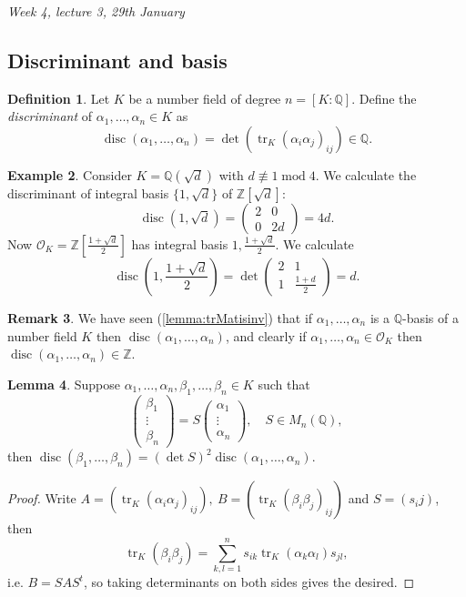\documentclass{article}
\newcommand{\Z}{\mathbb{Z}}
\newcommand{\Q}{\mathbb{Q}}
\newcommand{\tr}{\operatorname{tr}}
\newcommand{\Mod}{\operatorname{mod}}
\newcommand{\disc}{\operatorname{disc}}
\newcommand{\ri}{\mathcal{O}}
\theoremstyle{definition}
\newtheorem{defn}{Definition}[subsection]
\newtheorem{lemma}[defn]{Lemma}
\newtheorem{example}[defn]{Example}
\newtheorem{remark}[defn]{Remark}
\begin{document}
\begin{flushright}
\textit{Week 4, lecture 3, 29th January}
\end{flushright}

\subsection{Discriminant and basis}

\begin{defn}
Let $K$ be a number field of degree $n=[K:\Q]$. Define the \textit{discriminant} of $\alpha_1,\ldots,\alpha_n\in K$ as
\[
\disc(\alpha_1,\ldots,\alpha_n)=\det (\tr_K(\alpha_i\alpha_j)_{ij})\in\Q.
\]
\end{defn}

\begin{example}
Consider $K=\Q\left(\sqrt d\right)$ with $d\nequiv 1\Mod 4$. We calculate the discriminant of integral basis $\{1,\sqrt d\}$ of $\Z\left[\sqrt d\right]$:
\[
\disc\left(1,\sqrt d\right)=\begin{pmatrix}
2 & 0 \\ 0 & 2d
\end{pmatrix}=4d.
\]
Now $\ri_K=\Z\left[\frac{1+\sqrt d}{2}\right]$ has integral basis $1,\frac{1+\sqrt d}{2}$. We calculate
\[
\disc\left(1,\frac{1+\sqrt d}{2}\right)=\det\begin{pmatrix}
2 & 1 \\ 1 & \frac{1+d}{2}
\end{pmatrix}=d.
\]
\end{example}

\begin{remark}
We have seen (\ref{lemma:trMatisinv}) that if $\alpha_1,\ldots,\alpha_n$ is a $\Q$-basis of a number field $K$ then $\disc(\alpha_1,\ldots,\alpha_n)$, and clearly if $\alpha_1,\ldots,\alpha_n\in\ri_K$ then $\disc(\alpha_1,\ldots,\alpha_n)\in\Z$.
\end{remark}

\begin{lemma}
Suppose $\alpha_1,\ldots,\alpha_n,\beta_1,\ldots,\beta_n\in K$ such that
\[
\begin{pmatrix}
\beta_1 \\ \vdots \\ \beta_n
\end{pmatrix}=S\begin{pmatrix}
\alpha_1 \\ \vdots \\ \alpha_n
\end{pmatrix},\quad S\in M_n(\Q),
\]
then $\disc(\beta_1,\ldots,\beta_n)=(\det S)^2\disc(\alpha_1,\ldots,\alpha_n)$.
\end{lemma}
\begin{proof}
Write $A=(\tr_K(\alpha_i\alpha_j)_{ij}),\ B=(\tr_K(\beta_i\beta_j)_{ij})$ and $S=(s_ij)$, then
\[
\tr_K(\beta_i\beta_j)=\sum_{k,l=1}^n s_{ik}\tr_K(\alpha_k\alpha_l)s_{jl},
\]
i.e. $B=SAS^t$, so taking determinants on both sides gives the desired.
\end{proof}
\end{document}
